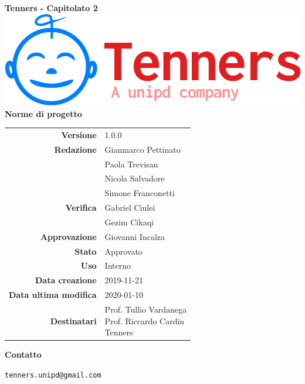 \begin{titlepage}
	\begin{center}
		\large \textbf{Tenners - Capitolato 2}
		\vfill
		\includegraphics[scale = 0.3]{./res/img/logo.png}\\
		\vfill
		\Huge \textbf{Norme di progetto}

        \vfill
        \large

        \begin{tabular}{r|l}
                        \textbf{Versione} & 1.0.0 \\
                        \textbf{Redazione} &
                        Gianmarco Pettinato\\&
                        Paola Trevisan \\&
                        Nicola Salvadore \\&
						Simone Franconetti\\
                        \textbf{Verifica} &
                        Gabriel Ciulei \\&
                        Gezim Cikaqi \\
                        \textbf{Approvazione} & Giovanni Incalza\\
                        \textbf{Stato} & Approvato \\
                        \textbf{Uso} &  Interno\\
                        \textbf{Data creazione} &  2019-11-21\\
                        \textbf{Data ultima modifica} & 2020-01-10\\
                        \textbf{Destinatari} & \parbox[t]{5cm}{Prof. Tullio Vardanega\\Prof. Riccardo Cardin\\Tenners}
                \end{tabular}
                \vfill
                \normalsize
                \vfill
                \textbf{Contatto}

                \texttt{tenners.unipd@gmail.com}

	\end{center}
\end{titlepage}
